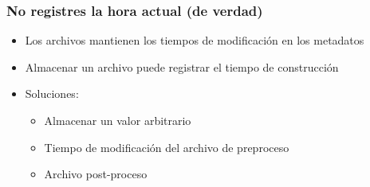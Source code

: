 \documentclass[14pt,aspectratio=169]{beamer}
\begin{document}
\begin{frame}[plain]
\end{frame}

\begin{frame}[fragile]
 \frametitle{No registres la hora actual (de verdad)}

 \begin{itemize}
  \item Los archivos mantienen los tiempos de modificación en los metadatos
  \item Almacenar un archivo puede registrar el tiempo de construcción
  \item<2-> Soluciones:
   \begin{itemize}
    \item Almacenar un valor arbitrario
    \item<3-> Tiempo de modificación del archivo de preproceso
    \item<4> Archivo post-proceso
   \end{itemize}
 \end{itemize}

 \begin{example}
\begin{semiverbatim}
\end{semiverbatim}
 \end{example}
\end{frame}
\end{document}
